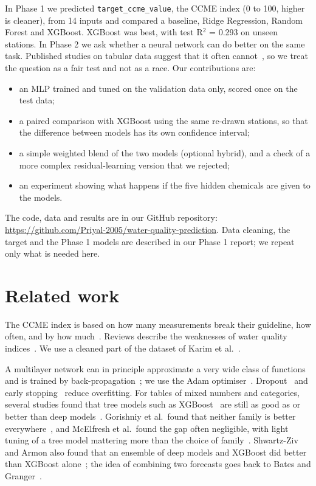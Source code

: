 \documentclass[conference]{IEEEtran}
\begin{document}
In Phase 1 we predicted \texttt{target\_ccme\_value}, the CCME index (0 to 100, higher is cleaner), from 14 inputs and compared a baseline, Ridge Regression, Random Forest and XGBoost. XGBoost was best, with test R$^2$ = 0.293 on unseen stations. In Phase 2 we ask whether a neural network can do better on the same task. Published studies on tabular data suggest that it often cannot~\cite{grinsztajn2022,shwartz2022,borisov2022,mcelfresh2023}, so we treat the question as a fair test and not as a race. Our contributions are:
\begin{itemize}
\item an MLP trained and tuned on the validation data only, scored once on the test data;
\item a paired comparison with XGBoost using the same re-drawn stations, so that the difference between models has its own confidence interval;
\item a simple weighted blend of the two models (optional hybrid), and a check of a more complex residual-learning version that we rejected;
\item an experiment showing what happens if the five hidden chemicals are given to the models.
\end{itemize}
The code, data and results are in our GitHub repository: \url{https://github.com/Priyal-2005/water-quality-prediction}. Data cleaning, the target and the Phase 1 models are described in our Phase 1 report; we repeat only what is needed here.

\section{Related work}
The CCME index is based on how many measurements break their guideline, how often, and by how much~\cite{ccme2001}. Reviews describe the weaknesses of water quality indices~\cite{chidiac2023}. We use a cleaned part of the dataset of Karim et al.~\cite{karim2025}.

A multilayer network can in principle approximate a very wide class of functions~\cite{hornik1989} and is trained by back-propagation~\cite{rumelhart1986}; we use the Adam optimiser~\cite{kingma2015}. Dropout~\cite{srivastava2014} and early stopping~\cite{prechelt1998} reduce overfitting. For tables of mixed numbers and categories, several studies found that tree models such as XGBoost~\cite{chen2016} are still as good as or better than deep models~\cite{grinsztajn2022,shwartz2022,borisov2022}. Gorishniy et al.\ found that neither family is better everywhere~\cite{gorishniy2021}, and McElfresh et al.\ found the gap often negligible, with light tuning of a tree model mattering more than the choice of family~\cite{mcelfresh2023}. Shwartz-Ziv and Armon also found that an ensemble of deep models and XGBoost did better than XGBoost alone~\cite{shwartz2022}; the idea of combining two forecasts goes back to Bates and Granger~\cite{bates1969}.
\end{document}
